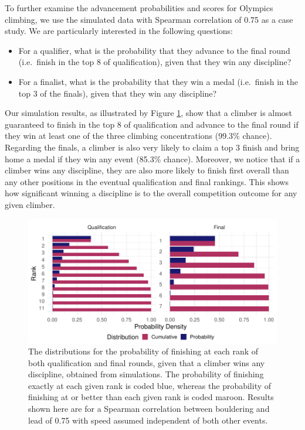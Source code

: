 \documentclass[letterpaper, inpress]{jds} %
\begin{document}
To further examine the advancement probabilities and scores for Olympics
climbing, we use the simulated data with Spearman correlation of 0.75 as
a case study. We are particularly interested in the following questions:

\vspace{1mm}

\begin{itemize}
\item
  For a qualifier, what is the probability that they advance to the
  final round (i.e.~finish in the top 8 of qualification), given that
  they win any discipline?

\vspace{1mm}  
  
\item
  For a finalist, what is the probability that they win a medal
  (i.e.~finish in the top 3 of the finals), given that they win any
  discipline?
\end{itemize}

\vspace{1mm}

Our simulation results, as illustrated by Figure \ref{fig:fig2}, show
that a climber is almost guaranteed to finish in the top 8 of
qualification and advance to the final round if they win at least one of
the three climbing concentrations (99.3\% chance). Regarding the finals,
a climber is also very likely to claim a top 3 finish and bring home a
medal if they win any event (85.3\% chance). Moreover, we notice that if
a climber wins any discipline, they are also more likely to finish first
overall than any other positions in the eventual qualification and final
rankings. This shows how significant winning a discipline is to the
overall competition outcome for any given climber.

\begin{figure}
\centering
\includegraphics{probs-1.pdf}
\caption{\label{fig:fig2}The distributions for the probability of
finishing at each rank of both qualification and final rounds, given
that a climber wins any discipline, obtained from simulations. The
probability of finishing exactly at each given rank is coded blue,
whereas the probability of finishing at or better than each given rank
is coded maroon. Results shown here are for a Spearman correlation
between bouldering and lead of 0.75 with speed assumed independent of
both other events.}
\end{figure}
\end{document}
